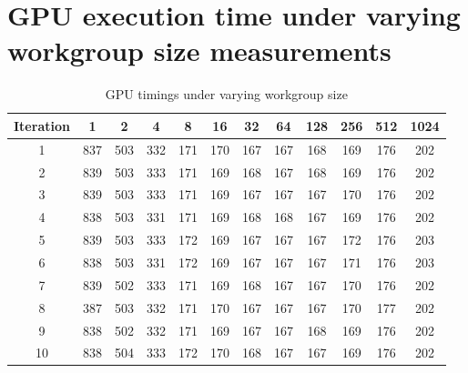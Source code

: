 \documentclass[journal,transmag]{IEEEtran}
\begin{document}
    \section{GPU execution time under varying workgroup size measurements}
    \begin{table}[h]
        \centering
        \caption{GPU timings under varying workgroup size}
        \label{GPUWorkGroupTableRaw}
        \begin{tabular}{ c c c c c c c c c c c c }
            Iteration &   1 &   2 &   4 &   8 &  16 &  32 &  64 & 128 & 256 & 512 & 1024 \\
            \hline
            \hline
             1        & 837 & 503 & 332 & 171 & 170 & 167 & 167 & 168 & 169 & 176 &  202 \\
             2        & 839 & 503 & 333 & 171 & 169 & 168 & 167 & 168 & 169 & 176 &  202 \\
             3        & 839 & 503 & 333 & 171 & 169 & 167 & 167 & 167 & 170 & 176 &  202 \\
             4        & 838 & 503 & 331 & 171 & 169 & 168 & 168 & 167 & 169 & 176 &  202 \\
             5        & 839 & 503 & 333 & 172 & 169 & 167 & 167 & 167 & 172 & 176 &  203 \\
             6        & 838 & 503 & 331 & 172 & 169 & 167 & 167 & 167 & 171 & 176 &  203 \\
             7        & 839 & 502 & 333 & 171 & 169 & 168 & 167 & 167 & 170 & 176 &  202 \\
             8        & 387 & 503 & 332 & 171 & 170 & 167 & 167 & 167 & 170 & 177 &  202 \\
             9        & 838 & 502 & 332 & 171 & 169 & 167 & 167 & 168 & 169 & 176 &  202 \\
            10        & 838 & 504 & 333 & 172 & 170 & 168 & 167 & 167 & 169 & 176 &  202 \\
        \end{tabular}
    \end{table}

    
    
\end{document}
